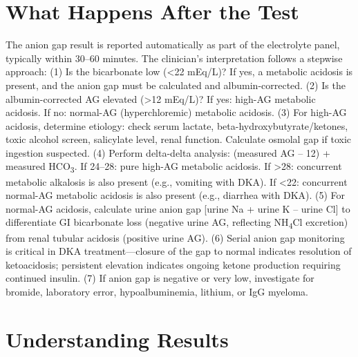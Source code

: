 \section*{What Happens After the Test}
The anion gap result is reported automatically as part of the electrolyte panel, typically within 30--60 minutes. The clinician's interpretation follows a stepwise approach: (1) Is the bicarbonate low (<22 mEq/L)? If yes, a metabolic acidosis is present, and the anion gap must be calculated and albumin-corrected. (2) Is the albumin-corrected AG elevated (>12 mEq/L)? If yes: high-AG metabolic acidosis. If no: normal-AG (hyperchloremic) metabolic acidosis. (3) For high-AG acidosis, determine etiology: check serum lactate, beta-hydroxybutyrate/ketones, toxic alcohol screen, salicylate level, renal function. Calculate osmolal gap if toxic ingestion suspected. (4) Perform delta-delta analysis: (measured AG -- 12) + measured HCO\textsubscript{3}. If 24--28: pure high-AG metabolic acidosis. If >28: concurrent metabolic alkalosis is also present (e.g., vomiting with DKA). If <22: concurrent normal-AG metabolic acidosis is also present (e.g., diarrhea with DKA). (5) For normal-AG acidosis, calculate urine anion gap [urine Na + urine K -- urine Cl] to differentiate GI bicarbonate loss (negative urine AG, reflecting NH\textsubscript{4}Cl excretion) from renal tubular acidosis (positive urine AG). (6) Serial anion gap monitoring is critical in DKA treatment---closure of the gap to normal indicates resolution of ketoacidosis; persistent elevation indicates ongoing ketone production requiring continued insulin. (7) If anion gap is negative or very low, investigate for bromide, laboratory error, hypoalbuminemia, lithium, or IgG myeloma.

\section*{Understanding Results}

